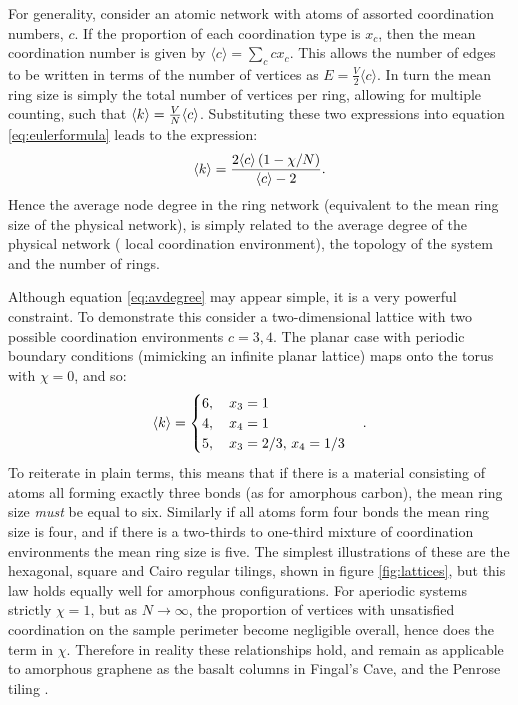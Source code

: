 For generality, consider an atomic network with atoms of assorted coordination numbers, $c$. 
If the proportion of each coordination type is $x_c$, then the mean coordination number is given by $\langle c \rangle = \sum\limits_c cx_c$.
This allows the number of edges to be written in terms of the number of vertices as $E=\frac{V}{2}\langle c \rangle$. 
In turn the mean ring size is simply the total number of vertices per ring, allowing for multiple counting, such that $\langle k \rangle=\frac{V}{N}\langle c \rangle$.
Substituting these two expressions into equation \eqref{eq:eulerformula} leads to the expression:
\begin{equation}
	\label{eq:avdegree}
	\langle k \rangle = \frac{2\langle c \rangle\left(1-\chi/N\right)}{\langle c \rangle - 2}.
\end{equation}
Hence the average node degree in the ring network (equivalent to the mean ring size of the physical network), is simply related to the average degree of the physical network (\ie{} local coordination environment), the topology of the system and the number of rings.

Although equation \eqref{eq:avdegree} may appear simple, it is a very powerful constraint. 
To demonstrate this consider a two\--dimensional lattice with two possible coordination environments $c=3,4$. 
The planar case with periodic boundary conditions (mimicking an infinite planar lattice) maps onto the torus with $\chi=0$, and so:
\begin{equation}
	\label{eq:2dplanarcases}
	\langle k \rangle = \begin{cases}
		6, \quad x_3 = 1 \\
		4, \quad x_4 = 1 \\
		5, \quad x_3 = 2/3,\, x_4 =1/3
	\end{cases}.
\end{equation}
To reiterate in plain terms, this means that if there is a material consisting of atoms all forming exactly three bonds (as for amorphous carbon), the mean ring size \textit{must} be equal to six. 
Similarly if all atoms form four bonds the mean ring size is four, and if there is a two\--thirds to one\--third mixture of coordination environments the mean ring size is five.
The simplest illustrations of these are the hexagonal, square and Cairo regular tilings, shown in figure \ref{fig:lattices}, but this law holds equally well for amorphous configurations.
For aperiodic systems strictly $\chi=1$, but as $N\rightarrow \infty$, the proportion of vertices with unsatisfied coordination on the sample perimeter become negligible overall, hence does the term in $\chi$.
Therefore in reality these relationships hold, and remain as applicable to amorphous graphene as the basalt columns in Fingal's Cave, and the Penrose tiling \cite{Goehring2014,Ressouche2009}.

